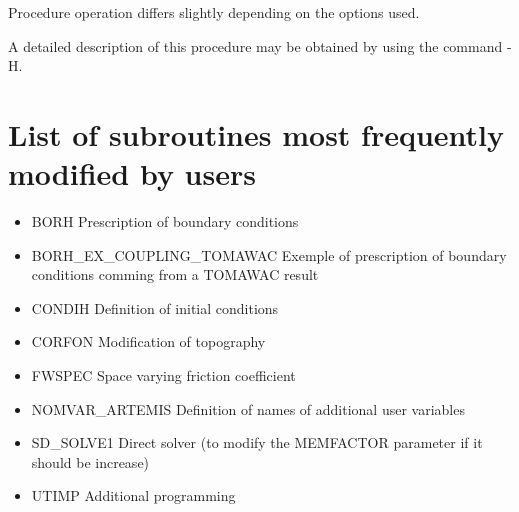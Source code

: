 Procedure operation differs slightly depending on the options used.

A detailed description of this procedure may be obtained by using the command \artemis{} -H.

\eject

\section{List of subroutines most frequently modified by users}

\begin{itemize}
\item BORH Prescription of boundary conditions

\item BORH\_EX\_COUPLING\_TOMAWAC Exemple of prescription of boundary conditions comming from a TOMAWAC result

\item CONDIH Definition of initial conditions

\item CORFON Modification of topography

\item FWSPEC Space varying friction coefficient

\item NOMVAR\_ARTEMIS Definition of names of additional user variables

\item SD\_SOLVE1 Direct solver (to modify the MEMFACTOR parameter if it should be increase)

\item UTIMP Additional programming
\end{itemize}

